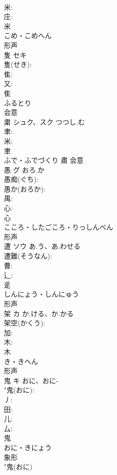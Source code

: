 \documentclass[8pt]{extreport}
\begin{document}
\begin{CJK}{UTF8}{min}
\\	米: 
\\	庄: 
\\	米	
\\	こめ・こめへん	
\\	形声 
\\	隻	セキ			
\\	隻(せき): 
\\	隹: 
\\	又: 
\\	隹	
\\	ふるとり	
\\	会意 
\\	粛	シュク、スク	つつし.む		
\\	聿: 
\\	米: 
\\	聿	
\\	ふで・ふでづくり	肅	会意 
\\	愚	グ	おろ.か		
\\	愚痴(ぐち): 
\\	愚か(おろか): 
\\	禺: 
\\	心: 
\\	心	
\\	こころ・したごころ・りっしんべん	
\\	形声 
\\	遭	ソウ	あ.う、あ.わせる		
\\	遭難(そうなん): 
\\	曹: 
\\	辶: 
\\	辵	
\\	しんにょう・しんにゅう	
\\	形声 
\\	架	カ	か.ける、か.かる		
\\	架空(かくう): 
\\	加: 
\\	木: 
\\	木	
\\	き・きへん	
\\	形声 
\\	鬼	キ	おに、おに-		
\\	"鬼(おに): 
\\	丿: 
\\	田: 
\\	儿: 
\\	厶: 
\\	鬼	
\\	おに・きにょう	
\\	象形 
\\	"鬼(おに) 

\end{CJK}
\end{document}
